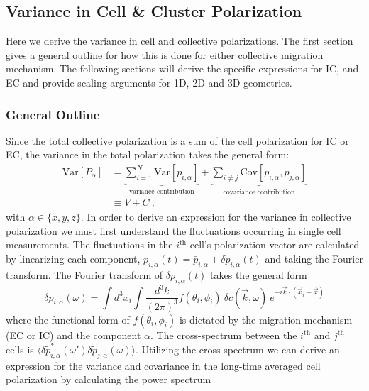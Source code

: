 \subsection{Variance in Cell \& Cluster Polarization}

Here we derive the variance in cell and collective polarizations. The first section gives a general outline for how this is done for either collective migration mechanism. The following sections will derive the specific expressions for IC, and EC and provide scaling arguments for 1D, 2D and 3D geometries.


\subsubsection{General Outline}
Since the total collective polarization is a sum of the cell polarization for IC or EC, the variance in the total polarization takes the general form:
\begin{equation} \label{eq:PVAR1}
\begin{split}
    \text{Var}[P_\alpha] &=
    \underbrace{\sum_{i=1}^N \text{Var}[p_{i,\alpha}]}_\text{variance contribution}
    + \underbrace{\sum_{i\neq j} \text{Cov}[p_{i,\alpha},p_{j,\alpha}]}_\text{covariance contribution} \\
    &\equiv V + C \ ,
\end{split}
\end{equation}
with $\alpha \in \{ x,y,z\}$.
In order to derive an expression for the variance in collective polarization we must first understand the fluctuations occurring in single cell measurements. The fluctuations in the $i^\text{th}$ cell's polarization vector are calculated by linearizing each component,
$p_{i,\alpha}(t) = \bar{p}_{i,\alpha} + \delta p_{i,\alpha}(t)$
and taking the Fourier transform. The Fourier transform of $\delta p_{i,\alpha}(t)$ takes the general form
\begin{equation}
    \delta\tilde{p}_{i,\alpha}(\omega) = \int d^3x_i \int \frac{d^3k}{(2\pi)^3} f(\theta_i,\phi_i) \ \delta\tilde{c}(\vec{k},\omega) \ e^{-i\vec{k}\cdot(\vec{x}_i+\vec{x})}
\end{equation}
where the functional form of $f(\theta_i,\phi_i)$ is dictated by the migration mechanism (EC or IC) and the component $\alpha$.
The cross-spectrum between the $i^\text{th}$ and $j^\text{th}$ cells is
$\langle \delta\tilde{p}_{i,\alpha}^*(\omega') \delta\tilde{p}_{j,\alpha}(\omega) \rangle$. Utilizing the cross-spectrum we can derive an expression for the variance and covariance in the long-time averaged cell polarization by calculating the power spectrum
